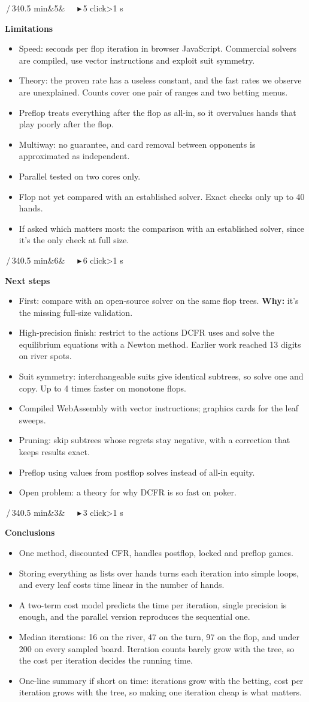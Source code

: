 \documentclass{article}
\newcommand{\slide}[4]{\clearpage
  \noindent\colorbox{bar}{\parbox{\dimexpr\linewidth-2\fboxsep}{\color{white}\fontsize{13}{15}\selectfont
  \textbf{\fontsize{21}{23}\selectfont #1}\,/\,34\hfill #3\ifx&#4&\else\ \ \ \textcolor{ck!40!white}{\ensuremath{\blacktriangleright}}\,#4 click\ifnum#4>1 s\fi\fi\\[2pt]
  \raggedright\textbf{\fontsize{15}{17.5}\selectfont #2}}}\par\vspace{5pt}
  \fontsize{15}{17.8}\selectfont\raggedright}
\newcommand{\pt}{\item[\textbullet]}
\newcommand{\ck}{\item[\textcolor{ck}{\ensuremath{\blacktriangleright}}]}
\newcommand{\why}{\textcolor{why}{\textbf{Why:}} }
\begin{document}
\slide{31}{Limitations}{0.5 min}{5}
\begin{itemize}
\pt Speed: seconds per flop iteration in browser JavaScript. Commercial solvers are compiled, use vector instructions and exploit suit symmetry.
\ck Theory: the proven rate has a useless constant, and the fast rates we observe are unexplained. Counts cover one pair of ranges and two betting menus.
\ck Preflop treats everything after the flop as all-in, so it overvalues hands that play poorly after the flop.
\ck Multiway: no guarantee, and card removal between opponents is approximated as independent.
\ck Parallel tested on two cores only.
\ck Flop not yet compared with an established solver. Exact checks only up to 40 hands.
\pt If asked which matters most: the comparison with an established solver, since it's the only check at full size.
\end{itemize}

\slide{32}{Next steps}{0.5 min}{6}
\begin{itemize}
\pt First: compare with an open-source solver on the same flop trees. \why it's the missing full-size validation.
\ck High-precision finish: restrict to the actions DCFR uses and solve the equilibrium equations with a Newton method. Earlier work reached 13 digits on river spots.
\ck Suit symmetry: interchangeable suits give identical subtrees, so solve one and copy. Up to 4 times faster on monotone flops.
\ck Compiled WebAssembly with vector instructions; graphics cards for the leaf sweeps.
\ck Pruning: skip subtrees whose regrets stay negative, with a correction that keeps results exact.
\ck Preflop using values from postflop solves instead of all-in equity.
\ck Open problem: a theory for why DCFR is so fast on poker.
\end{itemize}

\slide{33}{Conclusions}{0.5 min}{3}
\begin{itemize}
\pt One method, discounted CFR, handles postflop, locked and preflop games.
\ck Storing everything as lists over hands turns each iteration into simple loops, and every leaf costs time linear in the number of hands.
\ck A two-term cost model predicts the time per iteration, single precision is enough, and the parallel version reproduces the sequential one.
\ck Median iterations: 16 on the river, 47 on the turn, 97 on the flop, and under 200 on every sampled board. Iteration counts barely grow with the tree, so the cost per iteration decides the running time.
\pt One-line summary if short on time: iterations grow with the betting, cost per iteration grows with the tree, so making one iteration cheap is what matters.
\end{itemize}
\end{document}
